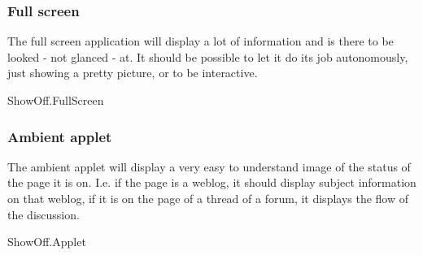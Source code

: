 \subsubsection{Full screen}

The full screen application will display a lot of information and is there to
be looked - not glanced - at. It should be possible to let it do its job
autonomously, just showing a pretty picture, or to be interactive.

\begin{module}{ShowOff.FullScreen}
\end{module}

\subsubsection{Ambient applet}

The ambient applet will display a very easy to understand image of the status
of the page it is on. I.e. if the page is a weblog, it should display subject
information on that weblog, if it is on the page of a thread of a forum, it
displays the flow of the discussion.

\begin{module}{ShowOff.Applet}
\end{module}

